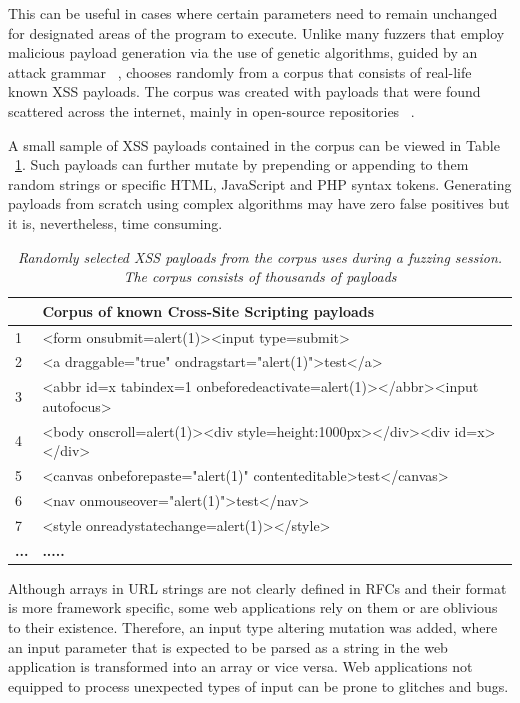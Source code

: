 This can be useful in cases where certain parameters need to remain unchanged for designated areas of the program to execute. Unlike many fuzzers that employ malicious payload generation via the use of genetic algorithms, guided by an attack grammar ~\cite{duchene2014kameleonfuzz}, \pname{} chooses randomly from a corpus that consists of real-life known XSS payloads. The corpus was created with payloads that were found scattered across the internet, mainly in open-source repositories ~\cite{seclist,xsspayloadfirst,xsspayloadsecond}.

A small sample of XSS payloads contained in the corpus can be viewed in Table ~\ref{xss_payload_tables}. Such payloads can further mutate by prepending or appending to them random strings or specific HTML, JavaScript and PHP syntax tokens. Generating payloads from scratch using complex algorithms may have zero false positives but it is, nevertheless, time consuming.

\begin{table}[ht]
\centering
 \begin{tabular}{@{}|l|l|@{}}
 \hline
 \textbf{ } & \textbf{Corpus of known Cross-Site Scripting payloads} \\ 
 \hline\hline
 1 & <form onsubmit=alert(1)><input type=submit> \\ 
 \hline
 2 & <a draggable="true" ondragstart="alert(1)">test</a> \\ 
 \hline
 3 & <abbr id=x tabindex=1 onbeforedeactivate=alert(1)></abbr><input autofocus> \\ 
 \hline
 4 & <body onscroll=alert(1)><div style=height:1000px></div><div id=x></div> \\ 
 \hline
 5 & <canvas onbeforepaste="alert(1)" contenteditable>test</canvas> \\
 \hline
 6 & <nav onmouseover="alert(1)">test</nav> \\
 \hline
 7 & <style onreadystatechange=alert(1)></style> \\
 \hline
 \textbf{...} & \textbf{.....} \\
 \hline
 \end{tabular}
 \captionsetup{justification=centering}
 \caption[Cross-Site Scripting payloads corpus]{\textit{Randomly selected XSS payloads from the corpus \pname{} uses during a fuzzing session. The corpus consists of thousands of payloads}}
 \label{xss_payload_tables}
\end{table}

Although arrays in URL strings are not clearly defined in RFCs and their format is more framework specific, some web applications rely on them or are oblivious to their existence. Therefore, an input type altering mutation was added, where an input parameter that is
expected to be parsed as a string in the web application is transformed into an array or vice versa. Web applications not equipped to process unexpected types of input can be prone to glitches and bugs.

